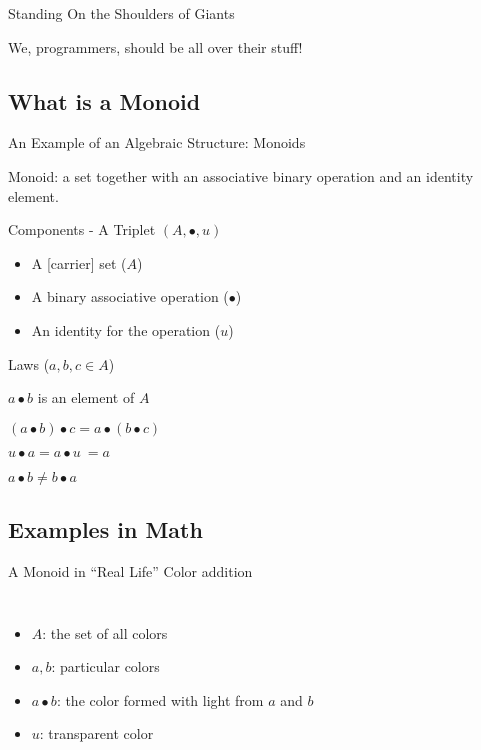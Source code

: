 \documentclass{beamer}
\begin{document}
\begin{framej}
\begin{frame}{Standing On the Shoulders of Giants}
  \begin{block}{}
  We, programmers, should be all over their stuff!
  \end{block}
\end{frame}


\subsection{What is a Monoid}

\begin{frame}{An Example of an Algebraic Structure: Monoids}
  \begin{block}{}
    \alert{Monoid:} a set together with an associative binary operation
      and an identity element.
  \end{block}

  \pause

  \begin{block}{Components - A Triplet \((A, \bullet, u)\)}
  \begin{itemize}
    \item A [carrier] set (\(A\))
    \item A binary associative operation (\(\bullet\))
    \item An identity for the operation (\(u\))
  \end{itemize}
  \end{block}

  \pause
  \begin{block}{Laws (\(a,b,c \in A\))}

  \begin{description}[Commutativity:]
    \item[Closure:] \(a \bullet b\) is an element of \(A\)
    \item[Associativity:] \((a \bullet b) \bullet c = a \bullet (b \bullet c)\)
    \item[Identity:] \(u \bullet a = a \bullet u \ = a\)
    \item[\sout{Commutativity:}] \(a \bullet b \neq b \bullet a\)
  \end{description}
  \end{block}
\end{frame}


\subsection{Examples in Math}
\begin{frame}{A Monoid in ``Real Life''}
  \alert{Color addition}
  \begin{columns}[c]
      \begin{itemize}
        \item \(A\): the set of all colors
        \item \(a, b\): particular colors
        \item \(a \bullet b\): the color formed with light from \(a\) and \(b\)
        \item \(u\): transparent color
      \end{itemize}


\end{columns}
\end{frame}
\end{framej}
\end{document}
